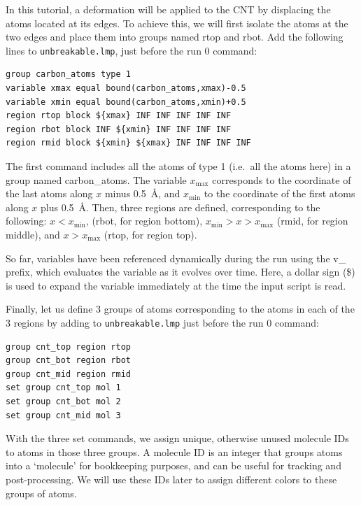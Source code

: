 \documentclass[9pt,tutorial]{livecoms}
\newcommand{\lmpcmd}[1]{\colorbox{listing}{\textcolor{command}{\small{#1}}}} %
\newcommand{\flecmd}[1]{\textcolor{command}{\texttt{#1}}} %
\begin{document}
In this tutorial, a deformation will be applied to the CNT by displacing
the atoms located at its edges.  To achieve this, we will first isolate the
atoms at the two edges and place them into groups named \lmpcmd{rtop} and
\lmpcmd{rbot}.  Add the following lines to \flecmd{unbreakable.lmp},
just before the \lmpcmd{run 0} command:
\begin{lstlisting}
group carbon_atoms type 1
variable xmax equal bound(carbon_atoms,xmax)-0.5
variable xmin equal bound(carbon_atoms,xmin)+0.5
region rtop block ${xmax} INF INF INF INF INF
region rbot block INF ${xmin} INF INF INF INF
region rmid block ${xmin} ${xmax} INF INF INF INF
\end{lstlisting}
The first command includes all the atoms of type 1 (i.e.~all the atoms here)
in a group named \lmpcmd{carbon\_atoms}.
The variable $x_\text{max}$ corresponds to the coordinate of the
last atoms along $x$ minus 0.5~Å, and $x_\text{min}$ to the coordinate
of the first atoms along $x$ plus 0.5~Å.  Then, three regions are defined,
corresponding to the following: $x < x_\text{min}$, (\lmpcmd{rbot}, for region
bottom), $x_\text{min} > x > x_\text{max}$ (\lmpcmd{rmid}, for region middle),
and $x > x_\text{max}$ (\lmpcmd{rtop}, for region top).

\begin{note}
  So far, variables have been referenced
  dynamically during the run using the \lmpcmd{v\_} prefix, which
  evaluates the variable as it evolves over time.  Here, a dollar sign
  (\$) is used to expand the variable immediately at the time the input
  script is read.
\end{note}

Finally, let us define 3 groups of atoms corresponding to the atoms
in each of the 3 regions by adding to \flecmd{unbreakable.lmp}
just before the \lmpcmd{run 0} command:
\begin{lstlisting}
group cnt_top region rtop
group cnt_bot region rbot
group cnt_mid region rmid
set group cnt_top mol 1
set group cnt_bot mol 2
set group cnt_mid mol 3
\end{lstlisting}
With the three \lmpcmd{set} commands, we assign unique, otherwise unused molecule
IDs to atoms in those three groups.  A molecule ID is an
integer that groups atoms into a `molecule' for bookkeeping purposes, and can be
useful for tracking and post-processing.  We will use these IDs later to assign
different colors to these groups of atoms.
\end{document}
